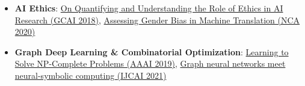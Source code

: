 
{\small
{}
\begin{itemize}
\item \textbf{AI Ethics}: {\small {\href{http://www.easychair.org/publications/paper/Z7D4}{On Quantifying and Understanding the Role of Ethics in AI Research (GCAI 2018)}}}, {\small {\href{http://arxiv.org/abs/1809.02208}{Assessing Gender Bias in Machine Translation (NCA 2020)}}}
    \item \textbf{Graph Deep Learning \& Combinatorial Optimization}: {\small {\href{http://arxiv.org/abs/1809.02721}{Learning to Solve NP-Complete Problems (AAAI 2019)}}}, {\small {\href{https://arxiv.org/pdf/1903.04598.pdf}{Graph neural networks meet neural-symbolic computing (IJCAI 2021)}}}
\end{itemize}
}